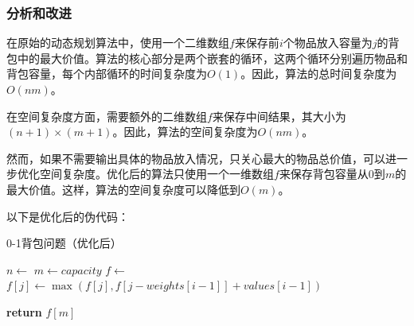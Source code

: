 \documentclass[lang=cn,11pt,a4paper]{elegantpaper}
\begin{document}
\subsubsection{分析和改进}
在原始的动态规划算法中，使用一个二维数组$f$来保存前$i$个物品放入容量为$j$的背包中的最大价值。算法的核心部分是两个嵌套的循环，这两个循环分别遍历物品和背包容量，每个内部循环的时间复杂度为$O(1)$。因此，算法的总时间复杂度为$O(nm)$。

在空间复杂度方面，需要额外的二维数组$f$来保存中间结果，其大小为$(n+1) \times (m+1)$。因此，算法的空间复杂度为$O(nm)$。

然而，如果不需要输出具体的物品放入情况，只关心最大的物品总价值，可以进一步优化空间复杂度。优化后的算法只使用一个一维数组$f$来保存背包容量从0到$m$的最大价值。这样，算法的空间复杂度可以降低到$O(m)$。

以下是优化后的伪代码：

\begin{algorithm}[H]
\caption{0-1背包问题（优化后）}\label{knapsack_optimized}
\begin{algorithmic}[1]
\State $n \gets$  
\State $m \gets capacity$ 
\State $f \gets$  
            \State $f[j] \gets \max(f[j], f[j-weights[i-1]] + values[i-1])$
        \EndIf
    \EndFor
\EndFor

\State \textbf{return} $f[m]$ 
\EndProcedure
\end{algorithmic}
\end{algorithm}
\end{document}
